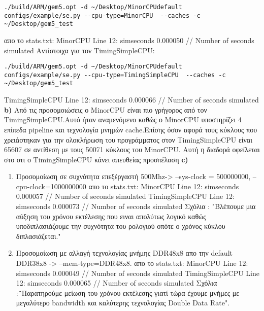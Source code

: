 \documentclass[10pt]{report}
\newcommand{\tu}{\textunderscore}
\begin{document}
\begin{lstlisting}
./build/ARM/gem5.opt -d ~/Desktop/MinorCPUdefault configs/example/se.py --cpu-type=MinorCPU  --caches -c ~/Desktop/gem5_test
\end{lstlisting}\newline
απο το stats.txt:\newline
MinorCPU\newline
Line 12:	sim\tu seconds	0.000050	// Number of seconds simulated\newline
Αντίστοιχα για τον TimingSimpleCPU:
\begin{lstlisting}
./build/ARM/gem5.opt -d ~/Desktop/MinorCPUdefault configs/example/se.py --cpu-type=TimingSimpleCPU  --caches -c ~/Desktop/gem5_test
\end{lstlisting}\newline
TimingSimpleCPU\newline
Line 12:	sim\tu seconds  0.000066	// Number of seconds simulated\newline
\textbf{b)}\newline
Από τις προσομοιώσεις ο MinorCPU είναι πιο γρήγορος από τον TimingSimpleCPU.Αυτό ήταν αναμενόμενο καθώς ο MinorCPU υποστηρίζει 4 επίπεδα pipeline και τεχνολογία  μνημών cache.Επίσης όσον αφορά τους κύκλους που χρειάστηκαν για την ολοκλήρωση του προγράμματος στον TimingSimpleCPU είναι 65607 σε αντίθεση με τους 50071 κύκλους του MinorCPU. Αυτή η διαδορά οφείλεται στο οτι ο TimingSimpleCPU κάνει απευθείας προσπέλαση\newline
\textbf{c)}\newline
\begin{enumerate}
\item Προσομοίωση σε συχνότητα επεξέργαστή 500Mhz-> --sys-clock = 500000000, --cpu-clock=1000000000 \newline
απο το stats.txt:\newline
MinorCPU\newline
Line 12:	sim\tu seconds	0.000057	// Number of seconds simulated\newline
TimingSimpleCPU\newline
Line 12:	sim\tu seconds  0.000073	// Number of seconds simulated\newline
Σχόλια : "Βλέπουμε μια αύξηση του χρόνου εκτέλεσης που ειναι απολύτως λογικό καθώς υποδιπλασιάζουμε την συχνότητα του ρολογιού οπότε ο χρόνος κύκλου διπλασιάζεται."
\item Προσομοίωση με αλλαγή τεχνολογίας μνήμης DDR4\tu 2400\tu 8x8 απο την default DDR3\tu 1600\tu 8x8 -> --mem-type=DDR4\tu 2400\tu 8x8.\newline
απο το stats.txt:\newline
MinorCPU\newline
Line 12:	sim\tu seconds	0.000049	// Number of seconds simulated\newline
TimingSimpleCPU\newline
Line 12:	sim\tu seconds  0.000065	// Number of seconds simulated\newline
Σχόλια :¨Παρατηρούμε μείωση του χρόνου εκτέλεσης γιατί τώρα έχουμε μνήμες με μεγαλύτερο bandwidth και καλύτερης τεχνολογίας Double Data Rate".
\end{enumerate}
\end{document}
